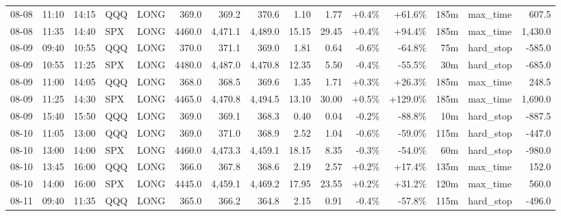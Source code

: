 \documentclass[11pt,a4paper,twoside]{article}
\begin{document}
\begin{landscape}
\begin{center}
\begin{longtable}{>{\color{txtmain}}l l l l l r r r r r r r r >{\color{txtmain}}l r}
08-08 & 11:10 & 14:15 & QQQ & LONG & 369.0 & 369.2 & 370.6 & 1.10 & 1.77 & \textcolor{wingreen}{+0.4\%} & \textcolor{wingreen}{+61.6\%} & 185m & max\_time & \textcolor{wingreen}{607.5} \\
08-08 & 11:35 & 14:40 & SPX & LONG & 4460.0 & 4,471.1 & 4,489.0 & 15.15 & 29.45 & \textcolor{wingreen}{+0.4\%} & \textcolor{wingreen}{+94.4\%} & 185m & max\_time & \textcolor{wingreen}{1,430.0} \\
08-09 & 09:40 & 10:55 & QQQ & LONG & 370.0 & 371.1 & 369.0 & 1.81 & 0.64 & \textcolor{lossred}{-0.6\%} & \textcolor{lossred}{-64.8\%} & 75m & hard\_stop & \textcolor{lossred}{-585.0} \\
08-09 & 10:55 & 11:25 & SPX & LONG & 4480.0 & 4,487.0 & 4,470.8 & 12.35 & 5.50 & \textcolor{lossred}{-0.4\%} & \textcolor{lossred}{-55.5\%} & 30m & hard\_stop & \textcolor{lossred}{-685.0} \\
08-09 & 11:00 & 14:05 & QQQ & LONG & 368.0 & 368.5 & 369.6 & 1.35 & 1.71 & \textcolor{wingreen}{+0.3\%} & \textcolor{wingreen}{+26.3\%} & 185m & max\_time & \textcolor{wingreen}{248.5} \\
08-09 & 11:25 & 14:30 & SPX & LONG & 4465.0 & 4,470.8 & 4,494.5 & 13.10 & 30.00 & \textcolor{wingreen}{+0.5\%} & \textcolor{wingreen}{+129.0\%} & 185m & max\_time & \textcolor{wingreen}{1,690.0} \\
08-09 & 15:40 & 15:50 & QQQ & LONG & 369.0 & 369.1 & 368.3 & 0.40 & 0.04 & \textcolor{lossred}{-0.2\%} & \textcolor{lossred}{-88.8\%} & 10m & hard\_stop & \textcolor{lossred}{-887.5} \\
08-10 & 11:05 & 13:00 & QQQ & LONG & 369.0 & 371.0 & 368.9 & 2.52 & 1.04 & \textcolor{lossred}{-0.6\%} & \textcolor{lossred}{-59.0\%} & 115m & hard\_stop & \textcolor{lossred}{-447.0} \\
08-10 & 13:00 & 14:00 & SPX & LONG & 4460.0 & 4,473.3 & 4,459.1 & 18.15 & 8.35 & \textcolor{lossred}{-0.3\%} & \textcolor{lossred}{-54.0\%} & 60m & hard\_stop & \textcolor{lossred}{-980.0} \\
08-10 & 13:45 & 16:00 & QQQ & LONG & 366.0 & 367.8 & 368.6 & 2.19 & 2.57 & \textcolor{wingreen}{+0.2\%} & \textcolor{wingreen}{+17.4\%} & 135m & max\_time & \textcolor{wingreen}{152.0} \\
08-10 & 14:00 & 16:00 & SPX & LONG & 4445.0 & 4,459.1 & 4,469.2 & 17.95 & 23.55 & \textcolor{wingreen}{+0.2\%} & \textcolor{wingreen}{+31.2\%} & 120m & max\_time & \textcolor{wingreen}{560.0} \\
08-11 & 09:40 & 11:35 & QQQ & LONG & 365.0 & 366.2 & 364.8 & 2.15 & 0.91 & \textcolor{lossred}{-0.4\%} & \textcolor{lossred}{-57.8\%} & 115m & hard\_stop & \textcolor{lossred}{-496.0} \\

\end{longtable}
\end{center}
\end{landscape}
\end{document}
